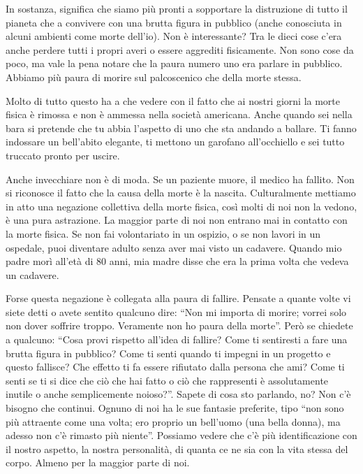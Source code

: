 In sostanza, significa che siamo più pronti a sopportare la distruzione di tutto il pianeta che a convivere con una brutta figura in pubblico (anche conosciuta in alcuni ambienti come morte dell'io). Non è interessante? Tra le dieci cose c'era anche perdere tutti i propri averi o essere aggrediti fisicamente. Non sono cose da poco, ma vale la pena notare che la paura numero uno era parlare in pubblico. Abbiamo più paura di morire sul palcoscenico che della morte stessa.

Molto di tutto questo ha a che vedere con il fatto che ai nostri giorni la morte fisica è rimossa e non è ammessa nella società americana. Anche quando sei nella bara si pretende che tu abbia l'aspetto di uno che sta andando a ballare. Ti fanno indossare un bell'abito elegante, ti mettono un garofano all'occhiello e sei tutto truccato pronto per uscire.

Anche invecchiare non è di moda. Se un paziente muore, il medico ha fallito. Non si riconosce il fatto che la causa della morte è la nascita. Culturalmente mettiamo in atto una negazione collettiva della morte fisica, così molti di noi non la vedono, è una pura astrazione. La maggior parte di noi non entrano mai in contatto con la morte fisica. Se non fai volontariato in un ospizio, o se non lavori in un ospedale, puoi diventare adulto senza aver mai visto un cadavere. Quando mio padre morì all'età di 80 anni, mia madre disse che era la prima volta che vedeva un cadavere.

Forse questa negazione è collegata alla paura di fallire. Pensate a quante volte vi siete detti o avete sentito qualcuno dire: ``Non mi importa di morire; vorrei solo non dover soffrire troppo. Veramente non ho paura della morte''. Però se chiedete a qualcuno: ``Cosa provi rispetto all'idea di fallire? Come ti sentiresti a fare una brutta figura in pubblico? Come ti senti quando ti impegni in un progetto e questo fallisce? Che effetto ti fa essere rifiutato dalla persona che ami? Come ti senti se ti si dice che ciò che hai fatto o ciò che rappresenti è assolutamente inutile o anche semplicemente noioso?''. Sapete di cosa sto parlando, no? Non c'è bisogno che continui. Ognuno di noi ha le sue fantasie preferite, tipo ``non sono più attraente come una volta; ero proprio un bell'uomo (una bella donna), ma adesso non c'è rimasto più niente''. Possiamo vedere che c'è più identificazione con il nostro aspetto, la nostra personalità, di quanta ce ne sia con la vita stessa del corpo. Almeno per la maggior parte di noi.

